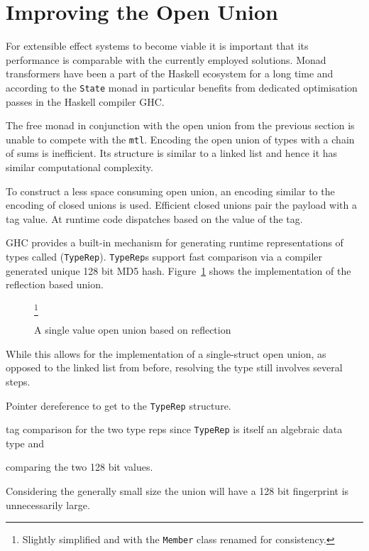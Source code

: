 \section{Improving the Open Union}

\label{sec:better-open-union}

For extensible effect systems to become viable it is important that its
performance is comparable with the currently employed solutions.
Monad transformers have been a part of the Haskell ecosystem for a long time and
according to \citeauthor{freer} the \texttt{State} monad in particular benefits
from dedicated optimisation passes in the Haskell compiler GHC.

The free monad in conjunction with the open union from the previous section is
unable to compete with the \texttt{mtl}. Encoding the open union of types with a
chain of sums is inefficient. Its structure is similar to a linked list and
hence it has similar computational complexity.

To construct a less space consuming open union, an encoding similar to the
encoding of closed unions is used. Efficient closed unions pair the payload
with a tag value. At runtime code dispatches based on the value of the tag.

GHC provides a built-in mechanism for generating runtime representations of
types called (\texttt{TypeRep}). \texttt{TypeRep}s support fast comparison via a
compiler generated unique 128 bit MD5 hash. Figure~\ref{fig:union-type} shows
the implementation of the reflection based union.

\begin{figure}
  
  \caption{A single value open union based on reflection}\footnote{Slightly
      simplified and with the \texttt{Member} class renamed for consistency.}
  \label{fig:union-type}
\end{figure}

While this allows for the implementation of a single-struct open union, as
opposed to the linked list from before, resolving the type still involves
several steps.
\begin{enumerate*}
\item Pointer dereference to get to the \texttt{TypeRep} structure.
\item tag comparison for the two type reps since \texttt{TypeRep} is itself an
  algebraic data type and
\item comparing the two 128 bit values.
\end{enumerate*}
Considering the generally small size the union will have a 128 bit fingerprint
is unnecessarily large.

